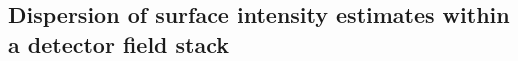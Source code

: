 \documentclass[iop]{emulateapj}
\newcommand{\sw}[1]{\textit{#1}} %
\begin{document}
% 
% 
% 
% 
% 

\subsection{Dispersion of surface intensity estimates within a detector field stack}
\end{document}
